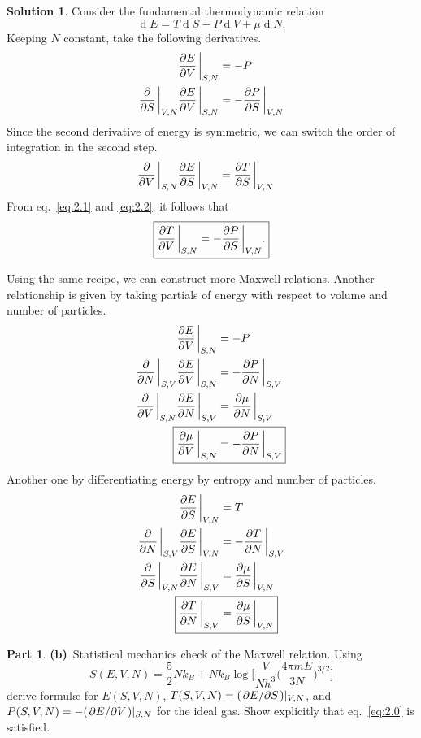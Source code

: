 \documentclass[11pt]{article}
\renewcommand{\d}[1]{\ensuremath{\operatorname{d}\!{#1}}}
\theoremstyle{definition}
\newtheorem{question}{Part}[section]
\newtheorem*{solution}{Solution}
\numberwithin{equation}{section}
\numberwithin{figure}{section}
\begin{document}
\begin{solution}
Consider the fundamental thermodynamic relation
\begin{equation}
\d{E} = T\d{S} - P\d{V} + \mu\d{N}.
\end{equation}
Keeping $N$ constant, take the following derivatives.
\begin{align}
\pdv{E}{V}\eval_{S,N} &= -P
\\
\pdv{S}\eval_{V,N} \pdv{E}{V}\eval_{S,N} &= - \pdv{P}{S}\eval_{V,N}\label{eq:2.1}
\end{align}
Since the second derivative of energy is symmetric, we can switch the order of integration in the second step.
\begin{align}
\pdv{V}\eval_{S,N} \pdv{E}{S}\eval_{V,N} &= \pdv{T}{S}\eval_{V,N}\label{eq:2.2}
\end{align}
From eq.~\eqref{eq:2.1} and \eqref{eq:2.2}, it follows that
\begin{equation}
\boxed{\pdv{T}{V}\eval_{S,N} = - \pdv{P}{S}\eval_{V,N}.}
\end{equation}

Using the same recipe, we can construct more Maxwell relations. Another relationship is given by taking partials of energy with respect to volume and number of particles.
\begin{align}
\pdv{E}{V}\eval_{S,N} &= -P
\\
\pdv{N}\eval_{S,V} \pdv{E}{V}\eval_{S,N} &= -\pdv{P}{N}\eval_{S,V}
\\
\pdv{V}\eval_{S,N} \pdv{E}{N}\eval_{S,V} &= \pdv{\mu}{N}\eval_{S,V}
\\
\Aboxed{\pdv{\mu}{V}\eval_{S,N} &= -\pdv{P}{N}\eval_{S,V}}
\end{align}
Another one by differentiating energy by entropy and number of particles.
\begin{align}
	\pdv{E}{S}\eval_{V,N} &= T
	\\
	\pdv{N}\eval_{S,V} \pdv{E}{S}\eval_{V,N} &= -\pdv{T}{N}\eval_{S,V}
	\\
	\pdv{S}\eval_{V,N} \pdv{E}{N}\eval_{S,V} &= \pdv{\mu}{S}\eval_{V,N}
	\\
	\Aboxed{\pdv{T}{N}\eval_{S,V} &= \pdv{\mu}{S}\eval_{V,N}}
\end{align}
\end{solution}

\begin{question}
\textbf{(b)}~Statistical mechanics check of the Maxwell relation. Using
\begin{equation}
S(E,V,N) = \frac{5}{2} Nk_B + Nk_B\log\Bigg[\frac{V}{Nh^3}\bigg( \frac{4\pi m E}{3N} \bigg)^{3/2}\Bigg]\label{eq:2b1}
\end{equation}
derive formul{\ae} for $E(S,V,N)$, $T(S,V,N) = (\pdv*{E}{S})|_{V,N}$, and $P(S,V,N) = -(\pdv*{E}{V})|_{S,N}$ for the ideal gas. Show explicitly that eq.~\eqref{eq:2.0} is satisfied.
\end{question}
\end{document}
